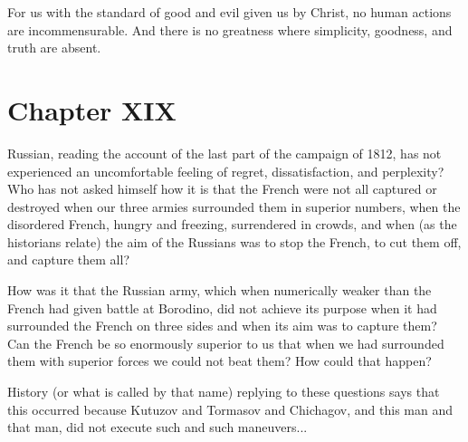 For us with the standard of good and evil given us by Christ, no
human actions are incommensurable. And there is no greatness
where simplicity, goodness, and truth are absent.


\chapter*{Chapter XIX} \ifaudio {}
\fi

 Russian, reading the account of the last part of the
campaign of 1812, has not experienced an uncomfortable feeling of
regret, dissatisfaction, and perplexity? Who has not asked
himself how it is that the French were not all captured or
destroyed when our three armies surrounded them in superior
numbers, when the disordered French, hungry and freezing,
surrendered in crowds, and when (as the historians relate) the
aim of the Russians was to stop the French, to cut them off, and
capture them all?

How was it that the Russian army, which when numerically weaker
than the French had given battle at Borodino, did not achieve its
purpose when it had surrounded the French on three sides and when
its aim was to capture them? Can the French be so enormously
superior to us that when we had surrounded them with superior
forces we could not beat them? How could that happen?

History (or what is called by that name) replying to these
questions says that this occurred because Kutuzov and Tormasov
and Chichagov, and this man and that man, did not execute such
and such maneuvers...

